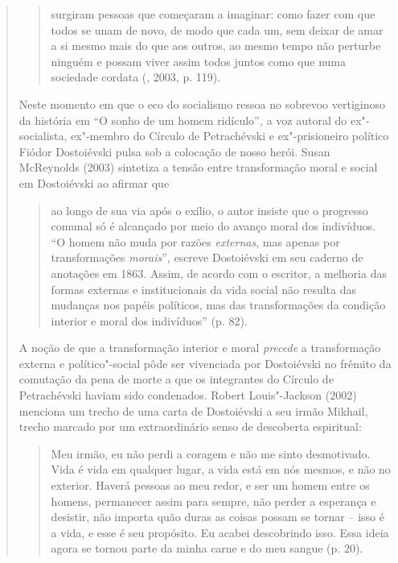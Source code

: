 {\begin{quote}
\begin{quote}
surgiram pessoas que começaram a imaginar: como fazer com que todos se
unam de novo, de modo que cada um, sem deixar de amar a si mesmo mais do
que aos outros, ao mesmo tempo não perturbe ninguém e possam viver assim
todos juntos como que numa sociedade cordata (, 2003, p.
119).
\end{quote}

Neste momento em que o eco do socialismo ressoa no sobrevoo vertiginoso
da história em ``O sonho de um homem ridículo''\emph{,} a voz autoral do
ex"-socialista, ex"-membro do Círculo de Petrachévski e ex"-prisioneiro
político Fiódor Dostoiévski pulsa sob a colocação de nosso herói. Susan
McReynolds (2003) sintetiza a tensão entre transformação moral e social
em Dostoiévski ao afirmar que

\begin{quote}
ao longo de sua via após o exílio, o autor insiste que o progresso
comunal só é alcançado por meio do avanço moral dos indivíduos. ``O
homem não muda por razões \emph{externas}, mas apenas por transformações
\emph{morais}'', escreve Dostoiévski em seu caderno de anotações em
1863. Assim, de acordo com o escritor, a melhoria das formas externas e
institucionais da vida social não resulta das mudanças nos papéis
políticos, mas das transformações da condição interior e moral dos
indivíduos'' (p. 82).
\end{quote}

A noção de que a transformação interior e moral \emph{precede} a
transformação externa e político"-social pôde ser vivenciada por
Dostoiévski no frêmito da comutação da pena de morte a que os
integrantes do Círculo de Petrachévski haviam sido condenados. Robert
Louis"-Jackson (2002) menciona um trecho de uma carta de Dostoiévski a
seu irmão Mikhail, trecho marcado por um extraordinário senso de
descoberta espiritual:

\begin{quote}
Meu irmão, eu não perdi a coragem e não me sinto desmotivado. Vida é
vida em qualquer lugar, a vida está em nós mesmos, e não no exterior.
Haverá pessoas ao meu redor, e ser um homem entre os homens, permanecer
assim para sempre, não perder a esperança e desistir, não importa quão
duras as coisas possam se tornar -- isso é a vida, e esse é seu
propósito. Eu acabei descobrindo isso. Essa ideia agora se tornou parte
da minha carne e do meu sangue (p. 20).
\end{quote}


\end{quote}}
